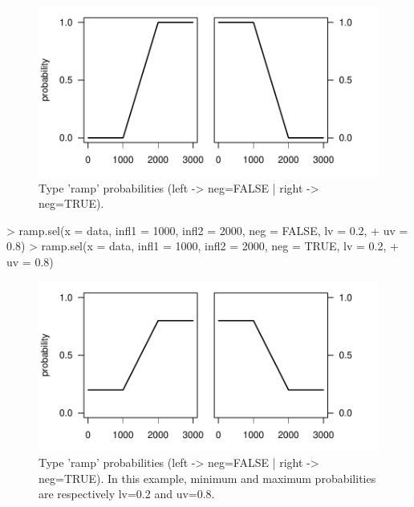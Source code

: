 \documentclass[letterpaper, 12pt]{article}
\begin{document}
\begin{figure}[h]
\vspace{-20pt}
\begin{center}
\includegraphics{relation_sel-015}
\end{center}
\vspace{-30pt}
\caption{Type 'ramp' probabilities (left -> neg=FALSE |  right -> neg=TRUE).}
\vspace{-10pt}
\label{fig7}
\end{figure}

\vspace*{\fill;}
\newpage


\begin{Schunk}
\begin{Sinput}
> ramp.sel(x = data, infl1 = 1000, infl2 = 2000, neg = FALSE, lv = 0.2, 
+     uv = 0.8)
> ramp.sel(x = data, infl1 = 1000, infl2 = 2000, neg = TRUE, lv = 0.2, 
+     uv = 0.8)
\end{Sinput}
\end{Schunk}

\begin{figure}[h]
\vspace{-20pt}
\begin{center}
\includegraphics{relation_sel-017}
\end{center}
\vspace{-30pt}
\caption{Type 'ramp' probabilities (left -> neg=FALSE |  right -> neg=TRUE). In this example, minimum and maximum probabilities are respectively lv=0.2 and uv=0.8.}
\vspace{-10pt}
\label{fig8}
\end{figure}
\end{document}
